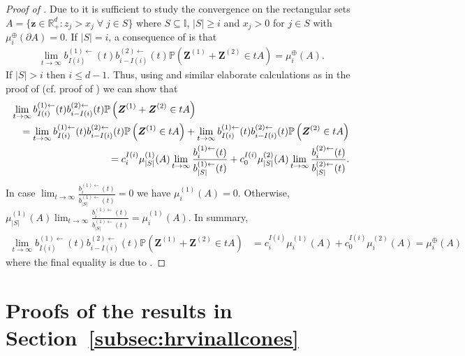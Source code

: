 \documentclass[aos]{imsart}
\numberwithin{equation}{section}
\theoremstyle{plain} %
\theoremstyle{remark}
\newcommand{\beao}{\begin{eqnarray*}}
\newcommand{\eeao}{\end{eqnarray*}\noindent}
\renewcommand\P{\mathbb{P}}
\newcommand{\R}{\mathbb{R}}
\def\bZ{\boldsymbol Z}
\def\bz{\boldsymbol z}
\begin{document}
\begin{proof}[Proof of ]
Due to  it is sufficient to study the convergence on the rectangular sets $A= \{\bz \in \R_+^d: z_j>x_j \;\forall\; j\in S\}$ where $S\subseteq \mathbb{I}$, $|S|\ge i$ and $x_j>0$ for $j\in S$ with $\mu_i^{\oplus}(\partial A)=0$. If $|S|=i$, a consequence of  is that
\beao
    \lim_{t\to\infty}b_{I(i)}^{(1)\leftarrow}(t)b_{i-I(i)}^{(2)\leftarrow}(t) \P\left(\bZ^{(1)}+\bZ^{(2)}\in tA\right)=\mu_i^{\oplus}(A).
\eeao
If $|S|>i$ then $i\leq d-1$. Thus, using  and similar
{elaborate} calculations as in the proof of  {(cf. proof of )}
we can show that
\beao
     \lefteqn{\lim_{t\to\infty}b_{I(i)}^{(1)\leftarrow}(t)b_{i-I(i)}^{(2)\leftarrow}(t) \P\left(\bZ^{(1)}+\bZ^{(2)}\in tA\right)} \\
        && =\lim_{t\to\infty}b_{I(i)}^{(1)\leftarrow}(t)b_{i-I(i)}^{(2)\leftarrow}(t) \P\left(\bZ^{(1)}\in tA\right)+
        \lim_{t\to\infty}b_{I(i)}^{(1)\leftarrow}(t)b_{i-I(i)}^{(2)\leftarrow}(t) \P\left(\bZ^{(2)}\in tA\right)\\
        &&=c_i^{I(i)}\mu^{(1)}_{|S|}(A)\lim_{t\to\infty}\frac{b_i^{(1)\leftarrow}(t)}{b_{|S|}^{(1)\leftarrow}(t)}
        +c_0^{I(i)}\mu^{(2)}_{|S|}(A)\lim_{t\to\infty}\frac{b_i^{(2)\leftarrow}(t)}{b_{|S|}^{(2)\leftarrow}(t)}.
\eeao
In  case $\lim_{t\to\infty}\frac{b_i^{(1)\leftarrow}(t)}{b_{|S|}^{(1)\leftarrow}(t)}=0$ we have $\mu^{(1)}_{i}(A)=0$.
Otherwise, $\mu^{(1)}_{|S|}(A)\lim_{t\to\infty}\frac{b_i^{(1)\leftarrow}(t)}{b_{|S|}^{(1)\leftarrow}(t)}=\mu^{(1)}_{i}(A)$.
In summary,
\begin{align*}
     \lim_{t\to\infty}b_{I(i)}^{(1)\leftarrow}(t)b_{i-I(i)}^{(2)\leftarrow}(t) \P\left(\bZ^{(1)}+\bZ^{(2)}\in tA\right)
        & =c_i^{I(i)}\mu^{(1)}_{i}(A)
        +c_0^{I(i)}\mu^{(2)}_{i}(A) =\mu_i^{\oplus}(A)
\end{align*}
where the final equality is due to 
        .
\end{proof}

\section{Proofs of the results in Section~\ref{subsec:hrvinallcones}} \label{app:subsec:hrvinallcones}
\end{document}
